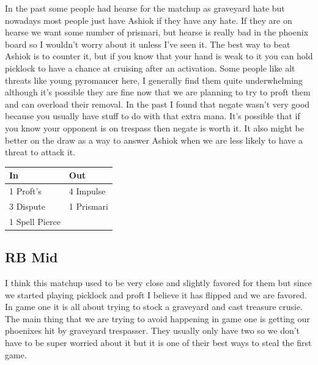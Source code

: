 \documentclass[12pt]{article}
\begin{document}
In the past some people had hearse for the matchup as graveyard hate but nowadays most people just have Ashiok if they have any hate. If they are on hearse we want some number of prismari, but hearse is really bad in the phoenix board so I wouldn't worry about it unless I've seen it. The best way to beat Ashiok is to counter it, but if you know that your hand is weak to it you can hold picklock to have a chance at cruising after an activation. Some people like alt threats like young pyromancer here, I generally find them quite underwhelming although it's possible they are fine now that we are planning to try to proft them and can overload their removal. In the past I found that negate wasn't very good because you usually have stuff to do with that extra mana. It's possible that if you know your opponent is on trespass then negate is worth it. It also might be better on the draw as a way to answer Ashiok when we are less likely to have a threat to attack it.

\begin{center}
    \begin{tabular}{|l|l|}
        \hline
        In             & Out        \\
        \hline
        1 Proft's      & 4 Impulse  \\
        3 Dispute      & 1 Prismari \\
        1 Spell Pierce &            \\
        \hline
    \end{tabular}
\end{center}

\subsection{RB Mid}
I think this matchup used to be very close and slightly favored for them but since we started playing picklock and proft I believe it has flipped and we are favored. In game one it is all about trying to stock a graveyard and cast treasure crusie. The main thing that we are trying to avoid happening in game one is getting our phoenixes hit by graveyard trespasser. They usually only have two so we don't have to be super worried about it but it is one of their best ways to steal the first game.
\end{document}
